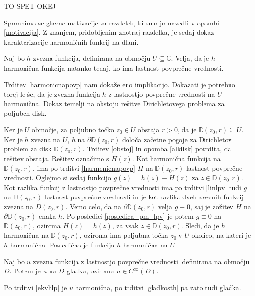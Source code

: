 \documentclass[mat1]{fmfdelo}
\newcommand{\C}{\mathbb C}
\begin{document}
     TO SPET OKEJ
     \begin{opomba}
        Spomnimo se glavne motivacije za razdelek, ki smo jo navedli v opombi \ref{motivacija}.
        Z znanjem, pridobljenim znotraj razdelka, je sedaj dokaz karakterizacije harmoničnih funkcij na dlani.
     \end{opomba}
     \begin{trditev}
        \label{ekvhlp}
        Naj bo $h$ zvezna funkcija, definirana na območju $U \subseteq \C$. Velja, da je $h$ harmonična funkcija natanko tedaj, ko ima lastnost povprečne vrednosti.
    \end{trditev}
    \begin{dokaz}
        Trditev \ref{harmonicnapovp} nam dokaže eno implikacijo. Dokazati je potrebno torej le še, da je zvezna funkcija $h$ z lastnostjo povprečne vrednosti na $U$ harmonična. 
        Dokaz temelji na obstoju rešitve Dirichletovega problema za poljuben disk. 
        
        Ker je $U$ območje, za poljubno točko $z_0 \in U$ obstaja $r>0$, da je $\overline{\mathbb{D}}(z_0,r) \subseteq U$. Ker je $h$ zvezna na $U$, $h$ na $\partial \overline{\mathbb{D}}(z_0, r)$ določa začetne pogoje za Dirichletov problem za disk $\mathbb{D}(z_0,r)$.
        Trditev \ref{obstoj} in opomba \ref{alldisk} potrdita, da rešitev obstaja. Rešitev označimo s $H(z)$.
        Kot harmonična funkcija na $\mathbb{D}(z_0, r)$, ima po trditvi \ref{harmonicnapovp} $H$ na $\mathbb{D}(z_0, r)$ lastnost povprečne vrednosti. 
        Oglejmo si sedaj funkcijo $g(z) = h(z) - H(z)$ za $z \in \overline{\mathbb{D}}(z_0,r)$. 
        Kot razlika funkcij z lastnostjo povprečne vrednosti ima po trditvi \ref{linlpv} tudi $g$ na $\mathbb{D}(z_0, r)$ lastnost povprečne vrednosti in je kot razlika dveh zveznih funkcij zvezna na $\overline{D}(z_0, r)$.
        Vemo celo, da na $\partial \overline{\mathbb{D}}(z_0, r)$ velja $g \equiv 0$, saj je zožitev $H$ na $\partial \overline{\mathbb{D}}(z_0,r)$ enaka $h$. 
        Po posledici \ref{posledica_pm_lpv} je potem $g \equiv 0$ na $\overline{\mathbb{D}}(z_0, r)$, oziroma $H(z) =  h(z)$, za vsak $z \in \overline{\mathbb{D}}(z_0, r)$. Sledi, da je $h$ harmonična na $\mathbb{D}(z_0, r)$, oziroma ima poljubna točka $z_0$ v $U$ okolico, na kateri je $h$ harmonična. 
        Posledično je funkcija $h$ harmonična na $U$.
    \end{dokaz}
    \begin{posledica}
        Naj bo $u$ zvezna funkcija z lastnostjo povprečne vrednosti, definirana na območju $D$. Potem je $u$ na $D$ gladka, oziroma $u \in C^{\infty}(D)$.
    \end{posledica}
    \begin{dokaz}
        Po trditvi \ref{ekvhlp} je $u$ harmonična, po trditvi \ref{gladkosth} pa zato tudi gladka.
    \end{dokaz}
\newpage
\end{document}
